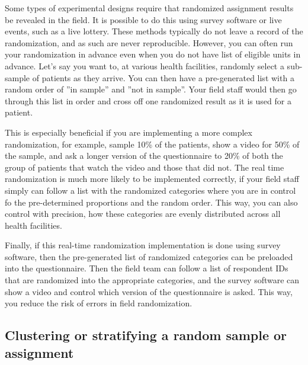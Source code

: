 
Some types of experimental designs require
that randomized assignment results be revealed in the field.
It is possible to do this using survey software or live events, such as a live lottery.
These methods typically do not leave a record of the randomization,
and as such are never reproducible.
However, you can often run your randomization in advance
even when you do not have list of eligible units in advance.
Let's say you want to, at various health facilities,
randomly select a sub-sample of patients as they arrive.
You can then have a pre-generated list
with a random order of ''in sample'' and ''not in sample''.
Your field staff would then go through this list in order
and cross off one randomized result as it is used for a patient.

This is especially beneficial if you are implementing a more complex randomization,
for example, sample 10\% of the patients, show a video for 50\% of the sample,
and ask a longer version of the questionnaire to 20\% of both
the group of patients that watch the video and those that did not.
The real time randomization is much more likely to be implemented correctly,
if your field staff simply can follow a list with the randomized categories
where you are in control fo the pre-determined proportions and the random order.
This way, you can also control with precision,
how these categories are evenly distributed across all health facilities.

Finally, if this real-time randomization implementation is done using survey software,
then the pre-generated list of randomized categories can be preloaded
into the questionnaire.
Then the field team can follow a list of respondent IDs
that are randomized into the appropriate categories,
and the survey software can show a video and control which version of the questionnaire is asked.
This way, you reduce the risk of errors in field randomization.



\subsection{Clustering or stratifying a random sample or assignment}

